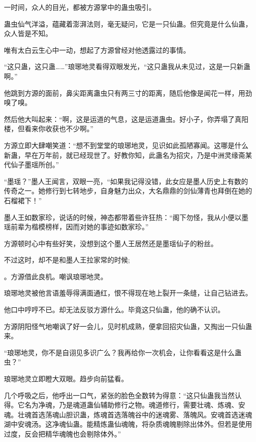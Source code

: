 
\begin{this_body}



一时间，众人的目光，都被方源掌中的蛊虫吸引。

蛊虫仙气洋溢，蕴藏着澎湃法则，毫无疑问，它是一只仙蛊。但究竟是什么仙蛊，众人皆是不知。

唯有太白云生心中一动，想起了方源曾经对他透露过的事情。

“这只蛊，这只蛊……”琅琊地灵看得双眼发光，“这只蛊我从未见过，这是一只新蛊啊。”

他跳到方源的面前，鼻尖距离蛊虫只有两三寸的距离，随后他像是闻花一样，用劲嗅了嗅。

然后他大叫起来：“啊，这是运道的气息，这是运道蛊虫。好小子，你弄塌了真阳楼，但看来你收获也不少啊。”

方源立即大肆嘲笑道：“想不到堂堂的琅琊地灵，见识如此孤陋寡闻。这哪是什么新蛊，早在万年前，就已经现世了。好教你知，此蛊名为招灾，乃是中洲灵缘斋某代仙子墨瑶所创。”

“墨瑶？”墨人王闻言，双眼一亮，“如果我记得没错，此女应是墨人历史上有数的传奇之一。她修行到七转地步，自身魅力出众，大名鼎鼎的剑仙薄青也拜倒在她的石榴裙下！”

墨人王如数家珍，说话的时候，神态都带着些许狂热：“阁下勿怪，我从小便以墨瑶前辈为楷模榜样，因而对她的事迹如数家珍。”

方源顿时心中有些好笑，没想到这个墨人王居然还是墨瑶仙子的粉丝。

不过这时，却不是和墨人王拉家常的时候;

。方源借此良机。嘲讽琅琊地灵。

琅琊地灵被他言语羞辱得满面通红，恨不得现在地上裂开一条缝，让自己钻进去。

他口中哼哼不已。却无法反驳方源什么。毕竟这只仙蛊，他的确不认识。

方源阴阳怪气地嘲讽了好一会儿，见时机成熟，便拿回招灾仙蛊，又掏出一只仙蛊来。

“琅琊地灵，你不是自诩见多识广么？我再给你一次机会，让你看看这是什么蛊虫？”

琅琊地灵立即瞪大双眼。趋步向前猛看。

几个呼吸之后，他呼出一口气，紧张的脸色全数转为得意：“这只仙蛊我当然认得。它名为净魂，乃是魂道蛊仙辅助修行之物。魂道修行，需要壮魂、炼魂、安魂。壮魂首选荡魂山胆识蛊，炼魂首选落魄谷中的迷魂雾、落魄风。安魂首选迷魂湖中安魂汤。这净魂仙蛊。能精炼蛊仙魂魄，将杂质魂魄剔除出体外。但若是使用过度，反会把精华魂魄也会剔除体外。”


\end{this_body}
